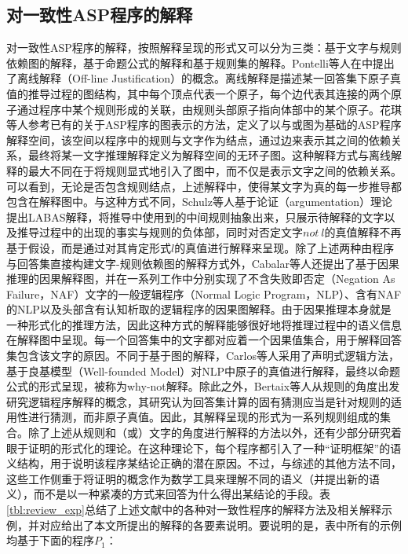 \subsection{对一致性ASP程序的解释}
对一致性ASP程序的解释，按照解释呈现的形式又可以分为三类：基于文字与规则依赖图的解释，基于命题公式的解释和基于规则集的解释。Pontelli等人在\cite{pontelli2006justifications, pontelli2009justifications}中提出了离线解释（Off-line Justification）的概念。离线解释是描述某一回答集下原子真值的推导过程的图结构，其中每个顶点代表一个原子，每个边代表其连接的两个原子通过程序中某个规则形成的关联，由规则头部原子指向体部中的某个原子。花琪等人参考已有的关于ASP程序的图表示的方法\cite{albrecht2014construction,linke2005suitable}，定义了以与或图为基础的ASP程序解释空间\cite{huaqi2018lp}，该空间以程序中的规则与文字作为结点，通过边来表示其之间的依赖关系，最终将某一文字推理解释定义为解释空间的无环子图。这种解释方式与离线解释的最大不同在于将规则显式地引入了图中，而不仅是表示文字之间的依赖关系。可以看到，无论是否包含规则结点，上述解释中，使得某文字为真的每一步推导都包含在解释图中。与这种方式不同，Schulz等人基于论证（argumentation）理论提出LABAS解释\cite{schulz2013argumentationbased,schulz2016justifying}，将推导中使用到的中间规则抽象出来，只展示待解释的文字以及推导过程中的出现的事实与规则的负体部，同时对否定文字$not\ l$的真值解释不再基于假设，而是通过对其肯定形式$l$的真值进行解释来呈现。除了上述两种由程序与回答集直接构建文字-规则依赖图的解释方式外，Cabalar等人还提出了基于因果推理的因果解释图，并在一系列工作中分别实现了不含失败即否定（Negation As Failure，NAF）文字的一般逻辑程序（Normal Logic Program，NLP）、含有NAF的NLP以及头部含有认知析取的逻辑程序的因果图解释\cite{albrecht2014construction,cabalar2016justificationsa,cabalar2017enablers}。由于因果推理本身就是一种形式化的推理方法，因此这种方式的解释能够很好地将推理过程中的语义信息在解释图中呈现。每一个回答集中的文字都对应着一个因果值集合，用于解释回答集包含该文字的原因。不同于基于图的解释，Carlos等人采用了声明式逻辑方法，基于良基模型（Well-founded Model）对NLP中原子的真值进行解释，最终以命题公式的形式呈现，被称为why-not解释\cite{viegasdamasio2013justifications}。除此之外，Bertaix等人从规则的角度出发研究逻辑程序解释的概念，其研究认为回答集计算的固有猜测应当是针对规则的适用性进行猜测，而非原子真值。因此，其解释呈现的形式为一系列规则组成的集合\cite{beatrix2016justifications}。除了上述从规则和（或）文字的角度进行解释的方法以外，还有少部分研究着眼于证明的形式化的理论\cite{denecker1993justification,denecker2015formal}。在这种理论下，每个程序都引入了一种“证明框架”的语义结构，用于说明该程序某结论正确的潜在原因。不过，与综述的其他方法不同，这些工作侧重于将证明的概念作为数学工具来理解不同的语义（并提出新的语义），而不是以一种紧凑的方式来回答为什么得出某结论的手段。表\ref{tbl:review_exp}总结了上述文献中的各种对一致性程序的解释方法及相关解释示例，并对应给出了本文所提出的解释的各要素说明。要说明的是，表中所有的示例均基于下面的程序$P_1$：
